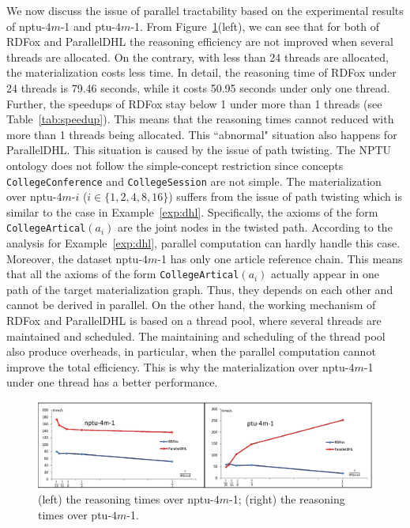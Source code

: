 We now discuss the issue of parallel tractability based on the experimental
results of nptu-$4m$-1 and ptu-$4m$-1.
From Figure~\ref{fig:diffthreads}(left),
we can see that for both of RDFox and ParallelDHL the reasoning efficiency are not
improved when several threads are allocated. On the contrary, with less than 24 threads are allocated,
the materialization costs less time. In detail,
the reasoning time of RDFox under 24 threads
is 79.46 seconds, while it costs 50.95 seconds under only one thread.
Further, the speedups of RDFox stay below 1 under more than 1 threads (see Table~\ref{tab:speedup}).
This means that the reasoning times cannot reduced with more than 1 threads being
allocated.
This ``abnormal" situation also happens for ParallelDHL.
This situation is caused by the issue of path twisting.
The NPTU ontology does not follow the simple-concept restriction since
concepts \texttt{CollegeConference} and \texttt{CollegeSession} are not simple.
The materialization over nptu-$4m$-$i$ ($i\in\{1,2,4,8,16\}$) suffers from the issue
of path twisting which is similar to the case in Example~\ref{exp:dhl}.
Specifically, the axioms of the form \texttt{CollegeArtical}$(a_i)$ are
the joint nodes in the twisted path.
According to the analysis for Example~\ref{exp:dhl}, parallel computation can hardly
handle this case. Moreover, the dataset nptu-$4m$-1 has only one
article reference chain. This means that all
the axioms of the form \texttt{CollegeArtical}$(a_i)$ actually
appear in one path of the target materialization graph.
Thus, they depends on each other and cannot be derived in parallel.
On the other hand, the working mechanism of RDFox and ParallelDHL is based on
a thread pool, where several threads are maintained and scheduled.
The maintaining and scheduling of the thread pool also produce
overheads, in particular, when the parallel computation
cannot improve the total efficiency.
This is why the materialization over nptu-$4m$-1 under one
thread has a better performance.

\begin{figure}[htbp]
\begin{center}
\includegraphics[width=1\textwidth]{fig-diff-threads.eps}
\caption{(left) the reasoning times over nptu-$4m$-1; (right) the reasoning times over ptu-$4m$-1.}
\label{fig:diffthreads}
\end{center}
\end{figure}

